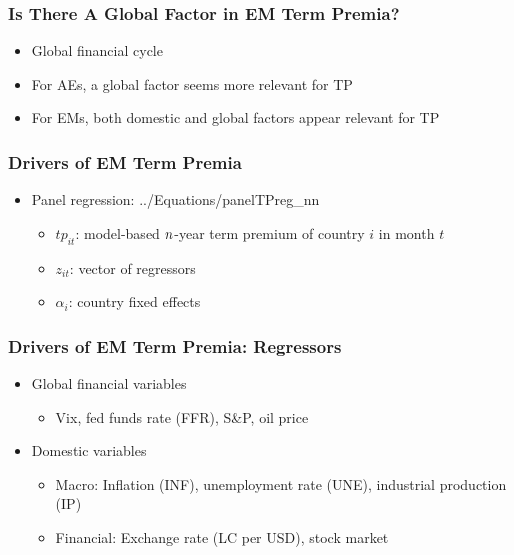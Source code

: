 \documentclass[12pt, aspectratio=169, xcolor=dvipsnames]{beamer}  %
\begin{document}
\begin{frame}
	\frametitle{Is There A Global Factor in EM Term Premia?}
	
	\begin{itemize}
		\item Global financial cycle \citep{Rey:2013}
		\item For AEs, a global factor seems more relevant for TP
		\item For EMs, both domestic and global factors appear relevant for TP
	\end{itemize}
\end{frame}

\begin{frame}
	\frametitle{Drivers of EM Term Premia}
	\begin{itemize}
		\item Panel regression:
		 {../Equations/panelTPreg_nn}
		\vspace{-0.5cm}
		\begin{itemize}
			\item $tp_{it}$: model-based $n$-year term premium of country $i$ in month $t$
			\item $z_{it}$: vector of regressors
			\item $\alpha_{i}$: country fixed effects
		\end{itemize}
	\end{itemize}
\end{frame}

\begin{frame}
	\frametitle{Drivers of EM Term Premia: Regressors}
	\begin{itemize}
		\item Global financial variables
		\begin{itemize}
			\item Vix, fed funds rate (FFR), S\&P, oil price
		\end{itemize}
		\item Domestic variables
		\begin{itemize}
			\item Macro: Inflation (INF), unemployment rate (UNE), industrial production (IP)
			\item Financial: Exchange rate (LC per USD), stock market
		\end{itemize}
	\end{itemize}
\end{frame}
\end{document}
